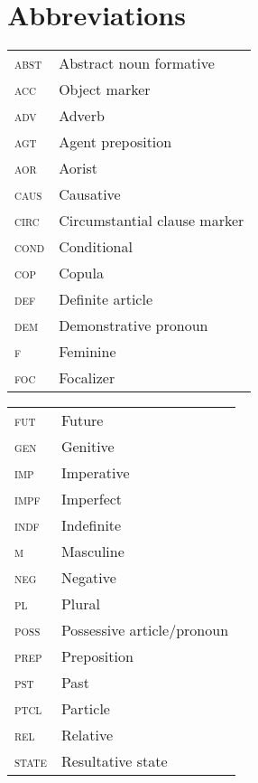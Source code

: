 \documentclass[output=paper]{LSP/langsci}
\begin{document}
\section*{Abbreviations}
\begin{tabularx}{.45\textwidth}{lQ}
\textsc{abst} & Abstract noun formative\\
\textsc{acc} & Object marker\\
\textsc{adv} & Adverb\\
\textsc{agt} & Agent preposition\\
\textsc{aor} & Aorist\\
\textsc{caus} & Causative\\
\textsc{circ} & Circumstantial clause marker\\
\textsc{cond} & Conditional\\
\textsc{cop} & Copula\\
\textsc{def} & Definite article\\ 
\textsc{dem} & Demonstrative pronoun\\
\textsc{f} & Feminine\\
\textsc{foc} & Focalizer\\
\end{tabularx}
\begin{tabularx}{.45\textwidth}{lQ}
\textsc{fut} & Future\\
\textsc{gen} & Genitive\\
\textsc{imp} & Imperative\\
\textsc{impf} & Imperfect\\
\textsc{indf} & Indefinite\\
\textsc{m} & Masculine\\
\textsc{neg} & Negative\\
\textsc{pl} & Plural\\
\textsc{poss} & Possessive article/pronoun\\
\textsc{prep} & Preposition\\
\textsc{pst} & Past\\
\textsc{ptcl} & Particle\\
\textsc{rel} & Relative\\
\textsc{state} & Resultative state\\
\end{tabularx}



{\sloppy
\printbibliography[heading=subbibliography,notkeyword=this] }
\end{document}
